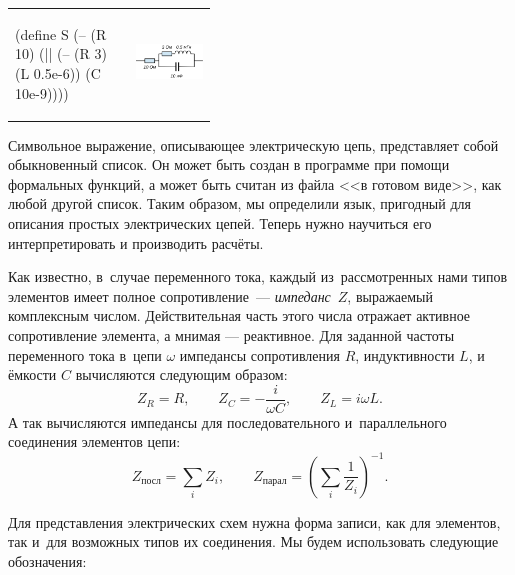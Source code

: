 \begin{tabular}{lm{0.4\linewidth}}%
\label{S}
\begin{SchemeCode}
(define S
  (-- (R 10)
      (|| (-- (R 3)
              (L 0.5e-6))
          (C 10e-9))))
\end{SchemeCode}
&
\includegraphics[width=\linewidth]{../figures/circuit.jpg}
\end{tabular}
\vspace{-\medskipamount}
Символьное выражение, описывающее электрическую цепь, представляет собой обыкновенный список. Он может быть создан в программе при помощи формальных функций, а может быть считан из файла <<в готовом виде>>, как любой другой список. Таким образом, мы определили язык, пригодный для описания простых электрических цепей. Теперь нужно научиться его интерпретировать и производить расчёты.

Как известно, в~случае переменного тока, каждый из~рассмотренных нами типов элементов имеет полное сопротивление~--- \emph{импеданс}~$Z$, выражаемый комплексным числом. Действительная часть этого числа отражает активное сопротивление элемента, а мнимая --- реактивное. Для заданной частоты переменного тока в~цепи $\omega$ импедансы сопротивления $R$, индуктивности $L$, и ёмкости $C$ вычисляются следующим образом:
$$Z_R = R,\qquad Z_C = -\frac{i}{\omega C},\qquad Z_L = i\omega L.$$
А так вычисляются импедансы для последовательного и~параллельного соединения элементов цепи:
$$Z_\text{посл} = \sum\limits_i Z_i,\qquad  Z_\text{парал}= \left(\sum\limits_i\frac1{Z_i}\right)^{-1}.$$

Для представления электрических схем нужна форма записи, как для элементов, так и~для возможных типов их соединения. Мы будем использовать следующие обозначения:

